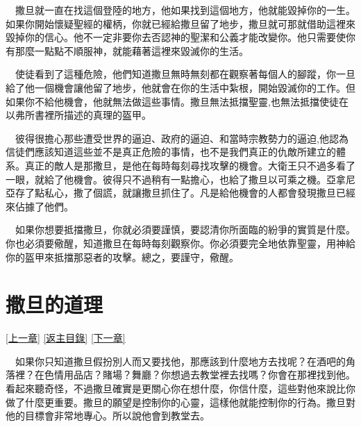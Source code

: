 \documentclass{book}
\begin{document}
　撒旦就一直在找這個登陸的地方，他如果找到這個地方，他就能毀掉你的一生。如果你開始懷疑聖經的權柄，你就已經給撒旦留了地步，撒旦就可那就借助這裡來毀掉你的信心。他不一定非要你去否認神的聖潔和公義才能改變你。他只需要使你有那麼一點點不順服神，就能藉著這裡來毀滅你的生活。

　使徒看到了這種危險，他們知道撒旦無時無刻都在觀察著每個人的腳蹤，你一旦給了他一個機會讓他留了地步，他就會在你的生活中紮根，開始毀滅你的工作。但如果你不給他機會，他就無法做這些事情。撒旦無法抵擋聖靈,也無法抵擋使徒在以弗所書裡所描述的真理的盔甲。

　彼得很擔心那些遭受世界的逼迫、政府的逼迫、和當時宗教勢力的逼迫,他認為信徒們應該知道這些並不是真正危險的事情，也不是我們真正的仇敵所建立的體系。真正的敵人是那撒旦，是他在每時每刻尋找攻擊的機會。大衛王只不過多看了一眼，就給了他機會。彼得只不過稍有一點擔心，也給了撒旦以可乘之機。亞拿尼亞存了點私心，撒了個謊，就讓撒旦抓住了。凡是給他機會的人都會發現撒旦已經來佔據了他們。

　如果你想要抵擋撒旦，你就必須要謹慎，要認清你所面臨的紛爭的實質是什麼。你也必須要儆醒，知道撒旦在每時每刻觀察你。你必須要完全地依靠聖靈，用神給你的盔甲來抵擋那惡者的攻擊。總之，要謹守，儆醒。

\chapter{撒旦的道理}
\label{sec:ch11}
\hyperref[sec:ch10]{[上一章]}
\hyperlink{toc}{[返主目錄]}
\hyperref[sec:ch12]{[下一章]}

\begin{center}
\noindent{}
\end{center}

　如果你只知道撒旦假扮別人而又要找他，那應該到什麼地方去找呢？在酒吧的角落裡？在色情用品店？賭場？舞廳？你想過去教堂裡去找嗎？你會在那裡找到他。看起來聽奇怪，不過撒旦確實是更關心你在想什麼，你信什麼，這些對他來說比你做了什麼更重要。撒旦的願望是控制你的心靈，這樣他就能控制你的行為。撒旦對他的目標會非常地專心。所以說他會到教堂去。
\end{document}
